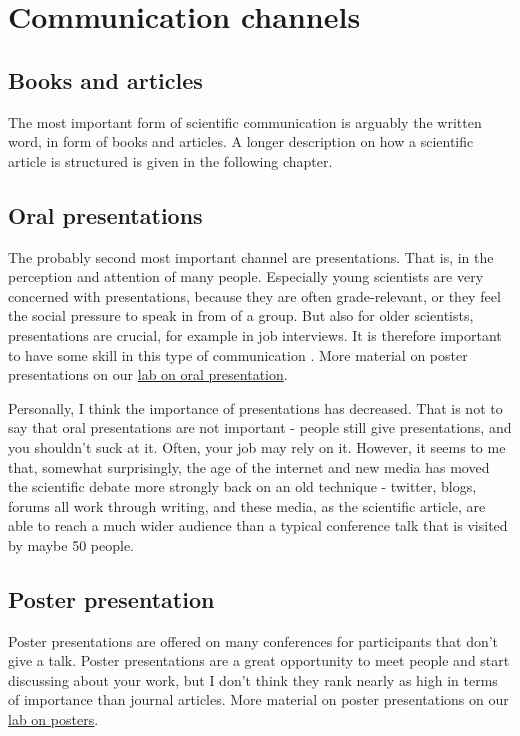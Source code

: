 \documentclass{tufte-book}
\begin{document}
\section{Communication channels}

\subsection{Books and articles}

The most important form of scientific communication is arguably the written word, in form of books and articles. A longer description on how a scientific article is structured is given in the following chapter. 

\subsection{Oral presentations}

The probably second most important channel are presentations. That is, in the perception and attention of many people. Especially young scientists are very concerned with presentations, because they are often grade-relevant, or they feel the social pressure to speak in from of a group. But also for older scientists, presentations are crucial, for example in job interviews. It is therefore important to have some skill in this type of communication \citep[see, e.g. the tips of][]{Kelleher-Tenguidelineseffective-2011}. More material on poster presentations on our \href{https://github.com/florianhartig/ResearchSkills/tree/master/Labs/OralPresentation}{lab on oral presentation}. 

Personally, I think the importance of presentations has decreased. That is not to say that oral presentations are not important - people still give presentations, and you shouldn't suck at it. Often, your job may rely on it. However, it seems to me that, somewhat surprisingly, the age of the internet and new media has moved the scientific debate more strongly back on an old technique - twitter, blogs, forums all work through writing, and these media, as the scientific article, are able to reach a much wider audience than a typical conference talk that is visited by maybe 50 people. 

\subsection{Poster presentation}

Poster presentations are offered on many conferences for participants that don't give a talk. Poster presentations are a great opportunity to meet people and start discussing about your work, but I don't think they rank nearly as high in terms of importance than journal articles. More material on poster presentations on our \href{https://github.com/florianhartig/ResearchSkills/tree/master/Labs/PosterPresentation}{lab on posters}. 
\end{document}

